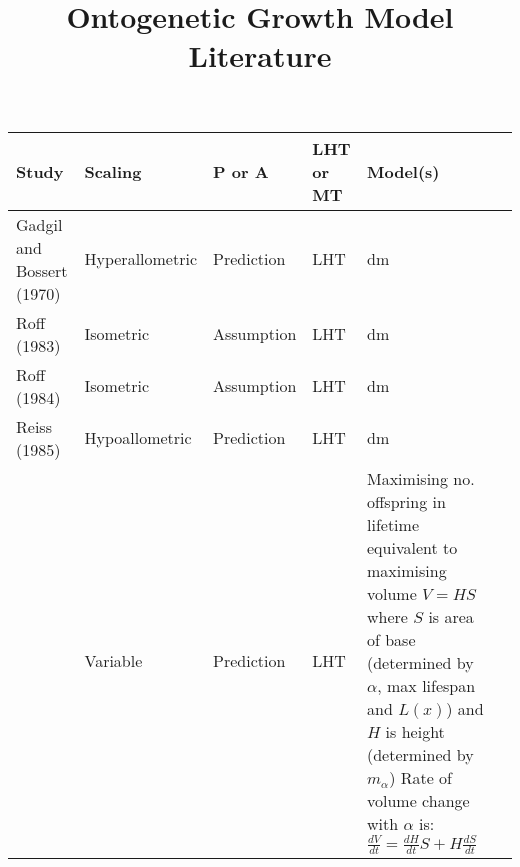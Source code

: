 \documentclass{article}
\title{Ontogenetic Growth Model Literature}
\date{}
\begin{document}

\begin{table}[]
    \begin{tabularx}{\textwidth}{|l|l|l|l|X|X|}%
    \hline
    \textbf{Study}                          & \textbf{Scaling} & \textbf{P or A}    & \textbf{LHT or MT}    & \textbf{Model(s)}                                                                                                                                                       \\ \hline
    Gadgil and Bossert (1970)               & Hyperallometric  & Prediction         & LHT                   & dm                                                                                                                                                    \\ \hline
    Roff (1983)                             & Isometric        & Assumption         & LHT                   & dm                                                                                                                                                    \\ \hline
    Roff (1984)                             & Isometric        & Assumption         & LHT                   & dm                                                                                                                                                    \\ \hline
    Reiss (1985)                            & Hypoallometric   & Prediction         & LHT                   & dm                                                                                                                                                    \\ \hline
    \cite{Kozowski1987-determinate}         & Variable         & Prediction         & LHT                   & \makecell[l]{Maximising no. offspring in lifetime equivalent to maximising volume \\ $V = HS$ \\ where $S$ is area of base (determined by $\alpha$, max lifespan and $L(x)$) and \\ $H$ is height (determined by $m_\alpha$) \\ Rate of volume change with $\alpha$ is: \\ $\frac{dV}{dt} = \frac{dH}{dt}S + H\frac{dS}{dt}$}                                                                                                                                                    \\ \hline

\end{tabularx}
\end{table}
\end{document}
